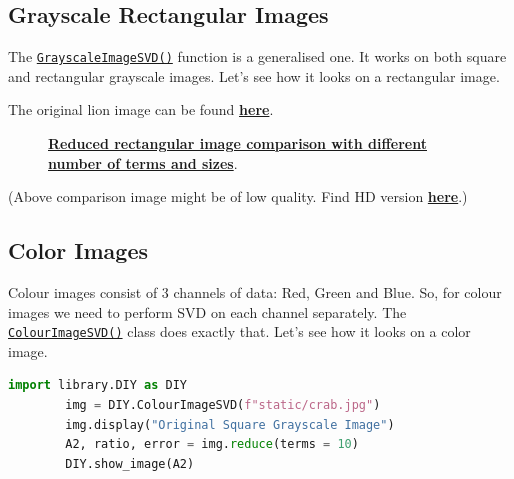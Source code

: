	\subsection{Grayscale Rectangular Images}
		The \href{https://github.com/PeithonKing/comp_phys_P346/blob/main/library/DIY.py#L50-L72}{\texttt{GrayscaleImageSVD()}}  function is a generalised one. It works on both square and rectangular grayscale images. Let's see how it looks on a rectangular image.

		The original lion image can be found \href{https://github.com/PeithonKing/comp_phys_P346/blob/main/static/lion.jpg}{\textbf{here}}.

		\begin{figure}[H]
			\centering
			\caption{\href{https://github.com/PeithonKing/comp_phys_P346/blob/main/static/lion_evolution.png}{\textbf{Reduced rectangular image comparison with different number of terms and sizes}}.}
			\label{fig:g_lion_evol}
		\end{figure}

		(Above comparison image might be of low quality. Find HD version \href{https://github.com/PeithonKing/comp_phys_P346/blob/main/static/lion_evolution.png}{\textbf{here}}.)

	\subsection{Color Images}

		Colour images consist of 3 channels of data: Red, Green and Blue. So, for colour images we need to perform SVD on each channel separately. The \href{https://github.com/PeithonKing/comp_phys_P346/blob/main/library/DIY.py#L74-L119}{\texttt{ColourImageSVD()}} class does exactly that. Let's see how it looks on a color image.

		\begin{lstlisting}[language=Python, caption={Working with colour images}, label={lst:c_crab_10}]
		import library.DIY as DIY
		img = DIY.ColourImageSVD(f"static/crab.jpg")
		img.display("Original Square Grayscale Image")
		A2, ratio, error = img.reduce(terms = 10)
		DIY.show_image(A2)\end{lstlisting}

